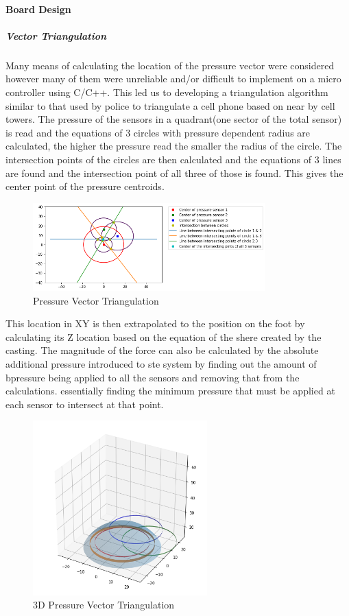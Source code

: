 \paragraph{Board Design}
\subparagraph{Vector Triangulation}
Many means of calculating the location of the pressure vector were considered however many of them were unreliable and/or difficult to implement on a micro controller using C/C++. This led us to developing a triangulation algorithm similar to that used by police to triangulate a cell phone based on near by cell towers. The pressure of the sensors in a quadrant(one sector of the total sensor) is read and the equations of 3 circles with pressure dependent radius are calculated, the higher the pressure read the smaller the radius of the circle. The intersection points of the circles are then calculated and the equations of 3 lines are found and the intersection point of all three of those is found. This gives the center point of the pressure centroids. 
\begin{figure}[H]
    \centering
    \includegraphics[width=0.8\textwidth]{figures/Triangulation.png}
    \caption{Pressure Vector Triangulation}
    \label{fig:PressureVectorTriangulation}
\end{figure}
This location in XY is then extrapolated to the position on the foot by calculating its Z location based on the equation of the shere created by the casting. The magnitude of the force can also be calculated by the absolute additional pressure introduced to ste system by finding out the amount of bpressure being applied to all the sensors and removing that from the calculations. essentially finding the minimum pressure that must be applied at each sensor to intersect at that point.
\begin{figure}[H]
    \centering
    \includegraphics[width=0.6\textwidth]{figures/Footsensordome.png}
    \caption{3D Pressure Vector Triangulation}
    \label{fig:3DPressureVectorTriangulation}
\end{figure}

